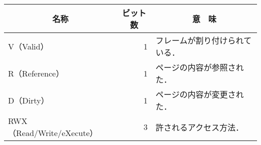 \documentclass{standalone}
\begin{document}
\begin{tabular}{l|r|l}
\hline\hline
\multicolumn{1}{c}{名称} &
 \multicolumn{1}{|c}{ビット数} &
 \multicolumn{1}{|c}{意　味} \\
\hline
V（Valid）               & 1 & フレームが割り付けられている．\\
R（Reference）           & 1 & ページの内容が参照された． \\
D（Dirty）               & 1 & ページの内容が変更された． \\
RWX（Read/Write/eXecute）& 3 & 許されるアクセス方法．\\
\end{tabular}
\end{document}
